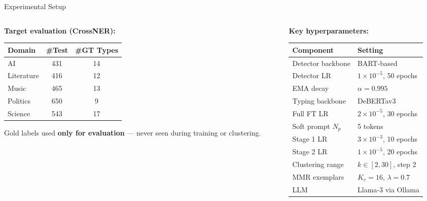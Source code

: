 \documentclass[aspectratio=169,10pt]{beamer}
\begin{document}
\begin{frame}{Experimental Setup}
\begin{columns}[T]
\begin{column}{0.5\textwidth}
      \vspace{0.5em}
      \textbf{Target evaluation (CrossNER):}
      \vspace{0.2em}
      \footnotesize
      \begin{tabular}{lcc}
        \toprule
        Domain & \#Test & \#GT Types \\
        \midrule
        AI           & 431 & 14 \\
        Literature   & 416 & 12 \\
        Music        & 465 & 13 \\
        Politics     & 650 &  9 \\
        Science      & 543 & 17 \\
        \bottomrule
      \end{tabular}
      \vspace{0.3em}
      \normalsize
      \begin{alertblock}{}
        \small Gold labels used \textbf{only for evaluation} — never seen during training or clustering.
      \end{alertblock}
    \end{column}
    \begin{column}{0.48\textwidth}
      \textbf{Key hyperparameters:}
      \vspace{0.3em}
      \footnotesize
      \setlength{\tabcolsep}{4pt}
      \begin{tabular}{ll}
        \toprule
        \textbf{Component} & \textbf{Setting} \\
        \midrule
        Detector backbone & BART-based \\
        Detector LR       & $1\times10^{-5}$, 50 epochs \\
        EMA decay         & $\alpha = 0.995$ \\
        \midrule
        Typing backbone   & DeBERTav3 \\
        Full FT LR        & $2\times10^{-5}$, 30 epochs \\
        Soft prompt $N_p$ & 5 tokens \\
        Stage 1 LR        & $3\times10^{-3}$, 10 epochs \\
        Stage 2 LR        & $1\times10^{-5}$, 20 epochs \\
        \midrule
        Clustering range  & $k\in[2,30]$, step 2 \\
        \midrule
        MMR exemplars     & $K_e=16$, $\lambda=0.7$ \\
        LLM               & Llama-3 via Ollama \\
        \bottomrule
      \end{tabular}
    \end{column}
  \end{columns}
\end{frame}
\end{document}
